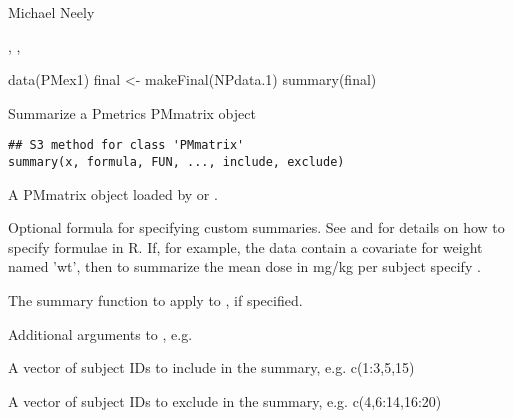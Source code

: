 \documentclass[a4paper]{book}
\begin{document}
%
\begin{Author}\relax
Michael Neely
\end{Author}
%
\begin{SeeAlso}\relax
{}, ,  
\end{SeeAlso}
%
\begin{Examples}
\begin{ExampleCode}
data(PMex1)
final <- makeFinal(NPdata.1)
summary(final)
\end{ExampleCode}
\end{Examples}
%
\begin{Description}\relax
Summarize a Pmetrics PMmatrix object
\end{Description}
%
\begin{Usage}
\begin{verbatim}
## S3 method for class 'PMmatrix'
summary(x, formula, FUN, ..., include, exclude)
\end{verbatim}
\end{Usage}
%
\begin{Arguments}
\begin{ldescription}
\item[\code{x}] A PMmatrix object loaded by  or .

\item[\code{formula}] Optional formula for specifying custom summaries.  See 
and  for details on how to specify formulae in R. If, for example, the data contain
a covariate for weight named 'wt', then to summarize the mean dose in mg/kg per subject specify 
.

\item[\code{FUN}] The summary function to apply to , if specified.

\item[\code{...}] Additional arguments to , e.g. 

\item[\code{include}] A vector of subject IDs to include in the summary, e.g. c(1:3,5,15)

\item[\code{exclude}] A vector of subject IDs to exclude in the summary, e.g. c(4,6:14,16:20)
\end{ldescription}
\end{Arguments}
\end{document}
